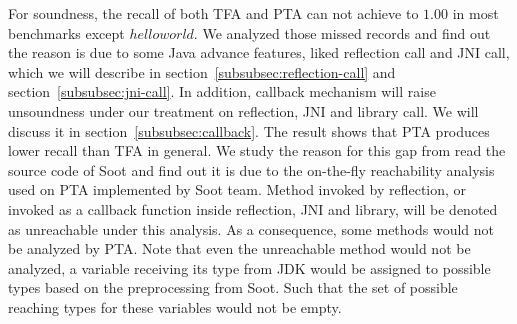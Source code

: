 \documentclass{fac}
\begin{document}
For soundness, the recall of both TFA and PTA can not achieve to $1.00$ in most benchmarks except $helloworld$. We analyzed those missed records and find out the reason is due to some Java advance features, liked reflection call and JNI call, which we will describe in section~\ref{subsubsec:reflection-call} and section~\ref{subsubsec:jni-call}. In addition,  callback mechanism will raise unsoundness under our treatment on reflection, JNI and library call. We will discuss it in section~\ref{subsubsec:callback}. The result shows that PTA produces lower recall than TFA in general. We study the reason for this gap from read the source code of Soot and find out it is due to the on-the-fly reachability analysis used on PTA implemented by Soot team. Method invoked by reflection, or invoked as a callback function inside reflection, JNI and library, will be denoted as unreachable under this analysis. As a consequence, some methods would not be analyzed by PTA. Note that even the unreachable method would not be analyzed, a variable receiving its type from JDK would be assigned to possible types based on the preprocessing from Soot. Such that the set of possible reaching types for these variables would not be empty.
\end{document}
